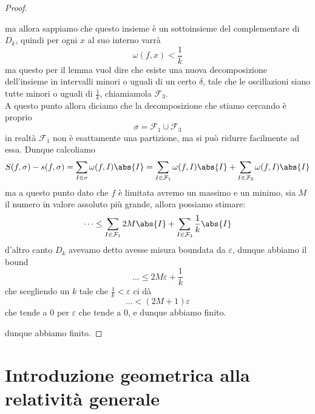 \documentclass[11pt]{scrartcl}
\begin{document}
\begin{proof}
\begin{description}
	 		ma allora sappiamo che questo insieme è un sottoinsieme del complementare di $D_k$, quindi per ogni $x$ al suo interno varrà
	 		$$\omega(f,x)<\frac{1}{k}$$
	 		ma questo per il lemma vuol dire che esiste una nuova decomposizione dell'insieme in intervalli minori o uguali di un certo $\delta$, tale che le oscillazioni siano tutte minori o uguali di $\frac{1}{k}$, chiamiamola $\mathcal{F}_3$. \\
	 		A questo punto allora diciamo che la decomposizione che stiamo cercando è proprio
	 		$$\sigma=\mathcal{F}_1\cup \mathcal{F}_3$$
	 		in realtà $\mathcal{F}_1$ non è esattamente una partizione, ma si può ridurre facilmente ad essa. Dunque calcoliamo
	 		$$S(f,\sigma)-s(f,\sigma)=\sum_{I\in \sigma}\omega(f,I)\abs{I}=\sum_{I\in \mathcal{F}_1}\omega(f,I)\abs{I}+\sum_{I\in \mathcal{F}_3}\omega(f,I)\abs{I}$$
	 		ma a questo punto dato che $f$ è limitata avremo un massimo e un minimo, sia $M$ il numero in valore assoluto più grande, allora possiamo stimare:
	 		$$\dots \le \sum_{I\in\mathcal{F}_1}2M\abs{I}+\sum_{I\in \mathcal{F}_3}\frac{1}{k}\abs{I}$$
	 		d'altro canto $D_k$ avevamo detto avesse misura boundata da $\varepsilon$, dunque abbiamo il bound
	 		$$\dots \le 2M\varepsilon+\frac{1}{k}$$
	 		che scegliendo un $k$ tale che $\frac{1}{k}<\varepsilon$ ci dà
	 		$$\dots< (2M+1)\varepsilon$$
	 		che tende a $0$ per $\varepsilon$ che tende a $0$, e dunque abbiamo finito.
	 	\end{description}
	 	dunque abbiamo finito.
	 \end{proof}
	 
	 \newpage
	 \section{Introduzione geometrica alla relatività generale}
	 
\end{document}
